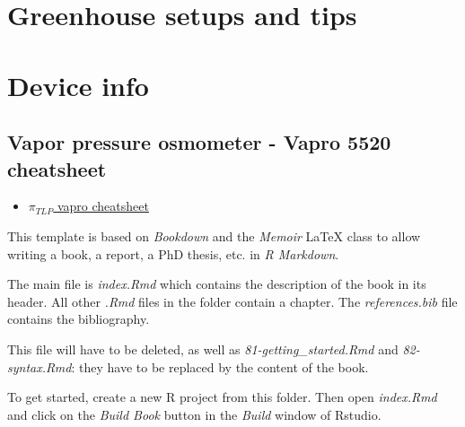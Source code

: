 \documentclass[
  12pt,
  american,
  a4paper,
  extrafontsizes,onecolumn,openright
  ]{memoir}
\makeatletter
\providecommand{\tightlist}{%
  \setlength{\itemsep}{0pt}\setlength{\parskip}{0pt}}
\newcommand{\MemoirChapStyle}{daleif1}
\newcommand{\MemoirPageStyle}{Ruled}
\newlength\widthw %
\newcommand*{\SmallMargins}{
  \setlrmarginsandblock{1.5in}{1.5in}{*}
  \setmarginnotes{0.1in}{0.1in}{0.1in}
 \setulmarginsandblock{1.5in}{1in}{*}
  \checkandfixthelayout
  \ch@ngetext
  \clearpage
  \setlength{\widthw}{\textwidth+\marginparsep+\marginparwidth}
  \footnotesatfoot
  \chapterstyle{\MemoirChapStyle}  %
  \pagestyle{\MemoirPageStyle}
}
\newcommand{\LargeMargins}{\SmallMargins}
\makeatother
\begin{document}
\hypertarget{greenhouse-setups-and-tips}{%
\chapter{Greenhouse setups and tips}\label{greenhouse-setups-and-tips}}

\hypertarget{device-info}{%
\chapter{Device info}\label{device-info}}

\hypertarget{vapor-pressure-osmometer---vapro-5520-cheatsheet}{%
\section{Vapor pressure osmometer - Vapro 5520 cheatsheet}\label{vapor-pressure-osmometer---vapro-5520-cheatsheet}}

\begin{itemize}
\tightlist
\item
  \href{./document/machine/Vapro\%205520/Vapro_cheatsheet.pdf}{\textbf{\(\pi_{TLP}\)} vapro cheatsheet}
\end{itemize}

This template is based on \emph{Bookdown} and the \emph{Memoir} LaTeX class to allow writing a book, a report, a PhD thesis, etc. in \emph{R Markdown}.

The main file is \emph{index.Rmd} which contains the description of the book in its header. All other \emph{.Rmd} files in the folder contain a chapter.
The \emph{references.bib} file contains the bibliography.

This file will have to be deleted, as well as \emph{81-getting\_started.Rmd} and \emph{82-syntax.Rmd}: they have to be replaced by the content of the book.

To get started, create a new R project from this folder.
Then open \emph{index.Rmd} and click on the \emph{Build Book} button in the \emph{Build} window of Rstudio.



\backmatter
\SmallMargins

\printbibliography
\onecolumn




\cleardoublepage
\LargeMargins
\listoffigures
\end{document}
